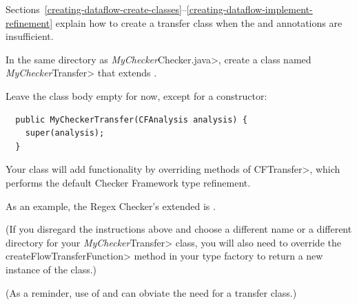 Sections~\ref{creating-dataflow-create-classes}--\ref{creating-dataflow-implement-refinement}
explain how to create a transfer class when the
 and
 annotations are insufficient.



In the same directory as \<\emph{MyChecker}Checker.java>, create a class
named \<\emph{MyChecker}Transfer> that extends
.

Leave the class body empty for now, except for a constructor:

\begin{Verbatim}
  public MyCheckerTransfer(CFAnalysis analysis) {
    super(analysis);
  }
\end{Verbatim}

\noindent
Your class will add functionality by
overriding methods of \<CFTransfer>, which performs the default Checker
Framework type refinement.

As an example, the Regex Checker's extended
 is
.

(If you disregard the instructions above and choose a different name or a
different directory for your \<\emph{MyChecker}Transfer> class, you will
also need to override the \<createFlowTransferFunction> method in your type
factory to return a new instance of the class.)

(As a reminder, use of  and
 can obviate the need for
a transfer class.)

%

